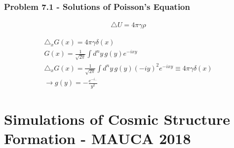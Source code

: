 \documentclass[10pt,a4paper]{article}
\theoremstyle{definition}
\begin{document}
\subsubsection{Problem 7.1 - Solutions of Poisson's Equation}
\begin{align}
    \triangle U=4\pi \gamma\rho
\end{align}

\begin{align}
    \triangle_x G(x)=4\pi \gamma\delta(x)\\
    G(x)=\frac{1}{\sqrt{2\pi}}\int d^ny\,g(y)e^{-ixy}\\
    \triangle_x G(x)=\frac{1}{\sqrt{2\pi}}\int d^ny\,g(y)(-iy)^2e^{-ixy}\equiv4\pi\gamma\delta(x)\\
    \rightarrow g(y)=-\frac{e^{-i..}}{y^2}
\end{align}

\newpage
\section{Simulations of Cosmic Structure Formation - MAUCA 2018}
\end{document}
